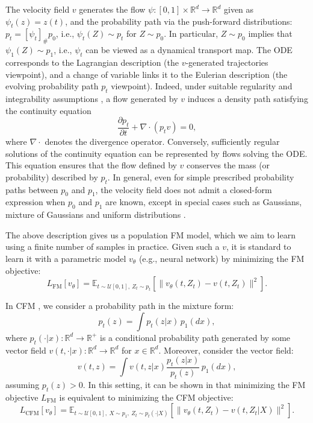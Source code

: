 \documentclass[a4paper,11pt]{article}
\newcommand{\R}{\mathbb{R}}
\theoremstyle{plain}
\theoremstyle{definition}
\begin{document}
The velocity field $v$ generates the flow $\psi: [0,1] \times \R^d \to \R^d$ given as $\psi_t(z) = z(t)$, and the probability path via the push-forward distributions: $p_t = [\psi_t]_{\#} p_0$, i.e., $\psi_t(Z) \sim p_t$ for $Z \sim p_0$. In particular, $Z \sim p_0$ implies that $\psi_1(Z) \sim p_1$, i.e., $\psi_t$ can be viewed as a dynamical transport map. The ODE corresponds to the Lagrangian description (the $v$-generated trajectories viewpoint), and a change of variable links it to the Eulerian description (the evolving probability path $p_t$ viewpoint). Indeed, under suitable regularity and integrability assumptions \cite{wald2025flow, albergo2024learning, albergo2023stochastic}, a flow generated by \(v\) induces a density path satisfying the continuity equation
\begin{equation} \label{eq_continuity}
    \frac{\partial p_t}{\partial t} + \nabla \cdot (p_t v) = 0,
\end{equation}
where $\nabla \cdot$ denotes the divergence operator. 
Conversely, sufficiently regular solutions of the continuity equation can be represented by flows solving the ODE.
This equation ensures that the flow defined by $v$ conserves the mass (or probability) described by $p_t$.  In general, even for simple prescribed probability paths between \(p_0\) and \(p_1\), the velocity field does not admit a closed-form expression when  $p_0$ and $p_1$ are known, except in special cases such as Gaussians, mixture of Gaussians and uniform distributions \cite{mena2025statistical}.


The above description gives us a population FM model, which we aim to learn using a finite number of samples in practice. Given such a $v$, it is standard to learn it with a parametric model $v_\theta$ (e.g., neural network) by minimizing the FM objective:
\begin{equation} 
L_{\text{FM}}[v_\theta] = \mathbb{E}_{t \sim \mathcal{U}[0,1], \ Z_t \sim p_t}[\|v_\theta(t, Z_t) - v(t, Z_t)\|^2]. 
\end{equation}

 In CFM \cite{lipman2022flow, tong2023improving}, we consider a  probability path in the mixture form:
\begin{equation} \label{mix_probpath}
p_t(z) = \int p_t(z |  x)\,p_1(dx), 
\end{equation}
where $p_t(\cdot | x): \R^d \to \R^+$ is a conditional probability path generated by some vector field $v(t, \cdot | x):  \R^d \to \R^d$ for $x \in \R^d$. Moreover, consider the vector field:
\begin{equation}
v(t,z)
=
\int v(t,z | x)
\frac{p_t(z | x)}{p_t(z)}
\,p_1(dx),    
\end{equation}
assuming $p_t(z)>0$.
In this setting, it can be shown in \cite{lipman2022flow} that minimizing the FM objective $L_{\text{FM}}$ is equivalent to minimizing the CFM objective:
\begin{equation}
    L_{\text{CFM}}[v_\theta]  = \mathbb{E}_{t \sim \mathcal{U}[0,1], \ X \sim p_1, \ Z_t \sim p_t(\cdot | X)}[\|v_\theta(t, Z_t) - v(t, Z_t| X)\|^2].
\end{equation}
\end{document}
